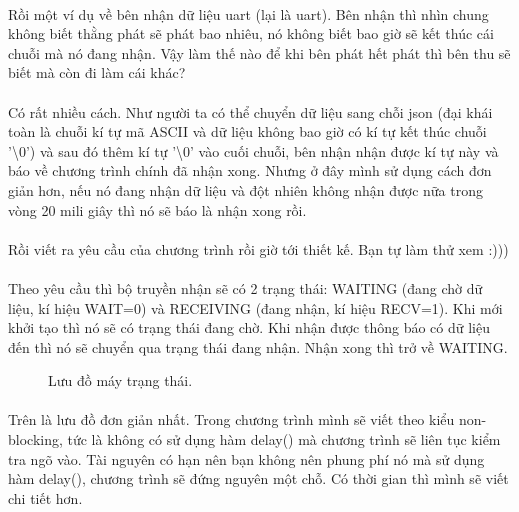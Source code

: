 \documentclass[12pt,a5paper]{book}
\begin{document}
\paragraph{}
Rồi một ví dụ về bên nhận dữ liệu uart (lại là uart). Bên nhận thì nhìn chung không biết thằng phát sẽ phát bao nhiêu, nó không biết bao giờ sẽ kết thúc cái chuỗi mà nó đang nhận. Vậy làm thế nào để khi bên phát hết phát thì bên thu sẽ biết mà còn đi làm cái khác?
\paragraph{}
Có rất nhiều cách. Như người ta có thể chuyển dữ liệu sang chỗi json (đại khái toàn là chuỗi kí tự mã ASCII và dữ liệu không bao giờ có kí tự kết thúc chuỗi '\textbackslash0') và sau đó thêm kí tự '\textbackslash0' vào cuối chuỗi, bên nhận nhận được kí tự này và báo về chương trình chính đã nhận xong. Nhưng ở đây mình sử dụng cách đơn giản hơn, nếu nó đang nhận dữ liệu và đột nhiên không nhận được nữa trong vòng 20 mili giây thì nó sẽ báo là nhận xong rồi.
\paragraph{}
Rồi viết ra yêu cầu của chương trình rồi giờ tới thiết kế. Bạn tự làm thử xem :)))
\paragraph{}
Theo yêu cầu thì bộ truyền nhận sẽ có 2 trạng thái: WAITING (đang chờ dữ liệu, kí hiệu WAIT=0) và RECEIVING (đang nhận, kí hiệu RECV=1). Khi mới khởi tạo thì nó sẽ có trạng thái đang chờ. Khi nhận được thông báo có dữ liệu đến thì nó sẽ chuyển qua trạng thái đang nhận. Nhận xong thì trở về WAITING.
\begin{figure}[h!]
	\centering
{}
\caption{Lưu đồ máy trạng thái.}

\end{figure}
\paragraph{}
Trên là lưu đồ đơn giản nhất. Trong chương trình mình sẽ viết theo kiểu non-blocking, tức là không có sử dụng hàm delay() mà chương trình sẽ liên tục kiểm tra ngõ vào. Tài nguyên có hạn nên bạn không nên phung phí nó mà sử dụng hàm delay(), chương trình sẽ đứng nguyên một chỗ. Có thời gian thì mình sẽ viết chi tiết hơn.
\end{document}
